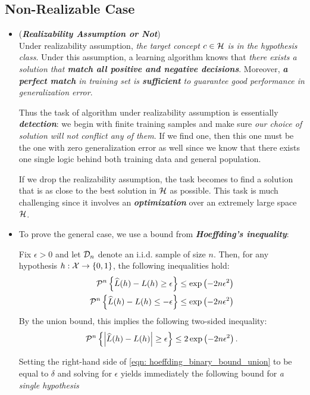 \documentclass[11pt]{article}
\begin{document}
\subsection{Non-Realizable Case}
\begin{itemize}
\item \begin{remark}(\textbf{\emph{Realizability Assumption or Not}})\\
Under realizability assumption, \emph{the target concept $c \in {\mathcal H}$ is in the hypothesis class}. Under this assumption,  a learning algorithm knows that \emph{there exists a solution that \textbf{match all positive and negative decisions}}. Moreover, \emph{\textbf{a perfect match} in training set is \textbf{sufficient} to guarantee good performance in generalization error}.

Thus the task of algorithm under realizability assumption is essentially \emph{\textbf{detection}}: we begin with finite training samples and make sure \emph{our choice of solution will not conflict any of them}. If we find one, then this one must be the one with zero generalization error as well since we know that there exists one single logic behind both training data and general population.

If we drop the  realizability assumption, the task becomes to find a solution that is as close to the best solution in ${\mathcal H}$ as possible. This task is much challenging since it involves an \emph{\textbf{optimization}} over an extremely large space ${\mathcal H}$.
\end{remark}


\item To prove the general case, we use a bound from \emph{\textbf{Hoeffding's inequality}}:
\begin{proposition}
Fix $\epsilon > 0$ and let ${\mathcal D}_{n}$ denote an i.i.d. sample of size $n$. Then, for any hypothesis $h: {\mathcal X} \to \left\{0, 1\right\}$, the following inequalities hold:
\begin{align}
{\mathcal P}^n\left\{\widehat{L}(h)  - L(h) \ge \epsilon\right\} \le \exp\left(-2n\epsilon^2\right) \label{eqn: hoeffding_binary_bound_1}\\
{\mathcal P}^n\left\{\widehat{L}(h)  - L(h) \le -\epsilon\right\} \le \exp\left(-2n\epsilon^2\right) \label{eqn: hoeffding_binary_bound_2}
\end{align}
By the union bound, this implies the following two-sided inequality:
\begin{align}
{\mathcal P}^n\left\{\left\lvert \widehat{L}(h)  - L(h) \right\rvert \ge \epsilon\right\} \le 2\exp\left(-2n\epsilon^2\right). \label{eqn: hoeffding_binary_bound_union}
\end{align}
\end{proposition}
Setting the right-hand side of \eqref{eqn: hoeffding_binary_bound_union} to be equal to $\delta$ and solving for $\epsilon$ yields immediately the following bound for \emph{a single hypothesis}


\end{itemize}
\end{document}
